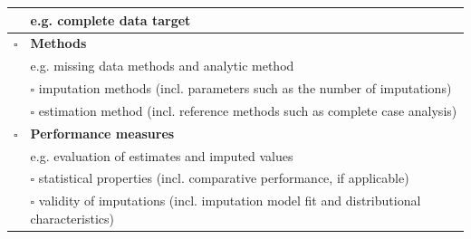 \documentclass[bimj,fleqn]{w-art}
\begin{document}
\begin{table}[ht!]
\begin{tabular}{ll}
  & e.g. complete data target                                                                      \\ \hline
$\square$ & \textbf{Methods}                                                                               \\
  & e.g. missing data methods and analytic method                                                  \\ \cline{2-2} 
  & $\square$ imputation methods (incl. parameters such as the number of   imputations)                    \\
  & $\square$ estimation method (incl. reference methods such as complete   case analysis)                 \\ \hline
$\square$ & \textbf{Performance measures}                                                                  \\
  & e.g. evaluation of estimates and imputed values                                                \\ \cline{2-2} 
  & $\square$ statistical properties (incl. comparative performance, if   applicable)                      \\
  & $\square$ validity of imputations (incl. imputation model fit and   distributional characteristics)    \\ \hline
\end{tabular}
\end{table}






\end{document}
